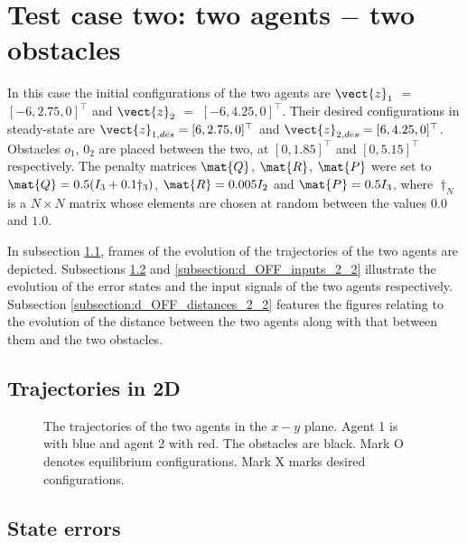 \section{Test case two: two agents $-$ two obstacles}

In this case the initial configurations of the two agents are
$\vect{z}_1$ $=$ $[-6, 2.75, 0]^{\top}$ and
$\vect{z}_2$ $=$ $[-6, 4.25, 0]^{\top}$.
Their desired configurations in steady-state are
$\vect{z}_{1,des} = [6, 2.75, 0]^{\top}$ and
$\vect{z}_{2,des} = [6, 4.25, 0]^{\top}$.
Obstacles $o_1$, $0_2$ are placed between the two, at $[0, 1.85]^{\top}$
and $[0, 5.15]^{\top}$ respectively. The penalty
matrices $\mat{Q}$, $\mat{R}$, $\mat{P}$ were set to
$\mat{Q} = 0.5 (I_3 + 0.1 \dagger_3)$, $\mat{R} = 0.005 I_2$ and
$\mat{P} = 0.5 I_3$, where $\dagger_N$ is a $N \times N$ matrix whose
elements are chosen at random between the values $0.0$ and $1.0$.

In subsection \ref{subsection:d_OFF_trajectories_2_2}, frames of the evolution of the
trajectories of the two agents are depicted. Subsections
\ref{subsection:d_OFF_errors_2_2} and \ref{subsection:d_OFF_inputs_2_2} illustrate
the evolution of the error states and the input signals of the two agents
respectively. Subsection \ref{subsection:d_OFF_distances_2_2} features the
figures relating to the evolution of the distance between the two agents
along with that between them and the two obstacles.


\subsection{Trajectories in 2D}
\label{subsection:d_OFF_trajectories_2_2}

\begin{figure}[H]
  
  \caption{The trajectories of the two agents in the $x-y$ plane. Agent 1 is with
    blue and agent 2 with red. The obstacles are black. Mark O denotes equilibrium
    configurations. Mark X marks desired configurations.}
  \label{fig:d_OFF_trajectory_2_2}
\end{figure}


\subsection{State errors}
\label{subsection:d_OFF_errors_2_2}

